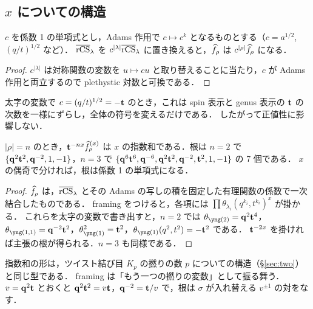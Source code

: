 \subsection{$x$ についての構造}
\begin{lemma}\label{lem:adams}
$c$ を係数 1 の単項式とし，Adams 作用で $c\mapsto c^k$ となるものとする（$c=a^{1/2}$, $(q/t)^{1/2}$ など）．
$\overline{\textrm{rCS}}_\lambda$ を $c^{|\lambda|}\overline{\textrm{rCS}}_\lambda$ に置き換えると，$\widehat{f}_\rho$ は $c^{|\rho|}\widehat{f}_\rho$ になる．
\end{lemma}
\begin{proof}
$c^{|\lambda|}$ は対称関数の変数を $u\mapsto cu$ と取り替えることに当たり，$c$ が Adams 作用と両立するので plethystic 対数と可換である．
\end{proof}
太字の変数で $c=(q/t)^{1/2}=-\mathbf{t}$ のとき，これは spin 表示と genus 表示の $\mathbf{t}$ の次数を一様にずらし，全体の符号を変えるだけである．
したがって正値性に影響しない．

\begin{proposition}\label{prop:expsum}
$|\rho|=n$ のとき，$\mathbf{t}^{-nx}\widehat{f}^{(x)}_\rho$ は $x$ の指数和である．根は
$n=2$ で $\{\mathbf{q}^2\mathbf{t}^2,\mathbf{q}^{-2},1,-1\}$，$n=3$ で $\{\mathbf{q}^6\mathbf{t}^6,\mathbf{q}^{-6},\mathbf{q}^2\mathbf{t}^2,\mathbf{q}^{-2},\mathbf{t}^2,1,-1\}$ の 7 個である．
$x$ の偶奇で分ければ，根は係数 1 の単項式になる．
\end{proposition}
\begin{proof}
$\widehat{f}_\rho$ は，$\overline{\textrm{rCS}}_\lambda$ とその Adams の写しの積を固定した有理関数の係数で一次結合したものである．
framing をつけると，各項には $\prod\theta_{\lambda_i}(q^{k_i},t^{k_i})^x$ が掛かる．
これらを太字の変数で書き出すと，$n=2$ では $\theta_{\yng(2)}=\bq^2\bt^4$，$\theta_{\yng(1,1)}=\bq^{-2}\bt^2$，$\theta_{\yng(1)}^2=\bt^2$，$\theta_{\yng(1)}(q^2,t^2)=-\bt^2$ である．
$\mathbf{t}^{-2x}$ を掛ければ主張の根が得られる．$n=3$ も同様である．
\end{proof}

指数和の形は，ツイスト結び目 $K_p$ の撚りの数 $p$ についての構造（\S\ref{sec:two}）と同じ型である．
framing は「もう一つの撚りの変数」として振る舞う．
$v=\mathbf{q}^2\mathbf{t}$ とおくと $\mathbf{q}^2\mathbf{t}^2=v\mathbf{t}$，$\mathbf{q}^{-2}=\mathbf{t}/v$ で，根は $\sigma$ が入れ替える $v^{\pm1}$ の対をなす．


